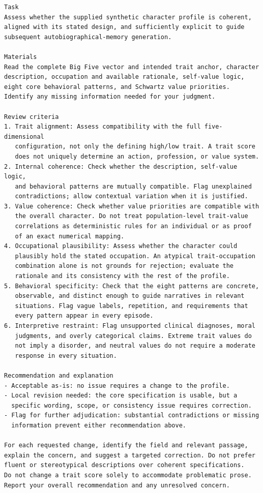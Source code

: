 \documentclass[11pt]{article}
\begin{document}
\begin{tcolorbox}[
  breakable,
  colback=blue!5,
  colframe=blue!60!black,
  title={\textbf{Character Profile Review Guideline}},
  fonttitle=\bfseries,
  rounded corners,
  boxrule=1.0pt
]
\begin{Verbatim}[fontsize=\scriptsize, breaklines=true, breaksymbolleft={}, breaksymbolright={}, breakindent=1em]
Task
Assess whether the supplied synthetic character profile is coherent,
aligned with its stated design, and sufficiently explicit to guide
subsequent autobiographical-memory generation.

Materials
Read the complete Big Five vector and intended trait anchor, character
description, occupation and available rationale, self-value logic,
eight core behavioral patterns, and Schwartz value priorities.
Identify any missing information needed for your judgment.

Review criteria
1. Trait alignment: Assess compatibility with the full five-dimensional
   configuration, not only the defining high/low trait. A trait score
   does not uniquely determine an action, profession, or value system.
2. Internal coherence: Check whether the description, self-value logic,
   and behavioral patterns are mutually compatible. Flag unexplained
   contradictions; allow contextual variation when it is justified.
3. Value coherence: Check whether value priorities are compatible with
   the overall character. Do not treat population-level trait-value
   correlations as deterministic rules for an individual or as proof
   of an exact numerical mapping.
4. Occupational plausibility: Assess whether the character could
   plausibly hold the stated occupation. An atypical trait-occupation
   combination alone is not grounds for rejection; evaluate the
   rationale and its consistency with the rest of the profile.
5. Behavioral specificity: Check that the eight patterns are concrete,
   observable, and distinct enough to guide narratives in relevant
   situations. Flag vague labels, repetition, and requirements that
   every pattern appear in every episode.
6. Interpretive restraint: Flag unsupported clinical diagnoses, moral
   judgments, and overly categorical claims. Extreme trait values do
   not imply a disorder, and neutral values do not require a moderate
   response in every situation.

Recommendation and explanation
- Acceptable as-is: no issue requires a change to the profile.
- Local revision needed: the core specification is usable, but a
  specific wording, scope, or consistency issue requires correction.
- Flag for further adjudication: substantial contradictions or missing
  information prevent either recommendation above.

For each requested change, identify the field and relevant passage,
explain the concern, and suggest a targeted correction. Do not prefer
fluent or stereotypical descriptions over coherent specifications.
Do not change a trait score solely to accommodate problematic prose.
Report your overall recommendation and any unresolved concern.
\end{Verbatim}
\end{tcolorbox}
\end{document}
